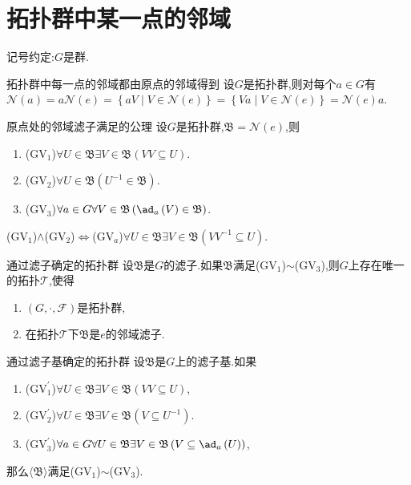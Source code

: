 \section{拓扑群中某一点的邻域}

记号约定:$G$是群.

\begin{proposition}{拓扑群中每一点的邻域都由原点的邻域得到}{}
	设$G$是拓扑群,则对每个$a\in G$有$\mathcal{N}\left(a\right)=a\mathcal{N}\left(e\right)=\left\{aV\middle|V\in\mathcal{N}\left(e\right)\right\}=\left\{Va\middle|V\in\mathcal{N}\left(e\right)\right\}=\mathcal{N}\left(e\right)a$.
\end{proposition}

\begin{proposition}{原点处的邻域滤子满足的公理}{}
	设$G$是拓扑群,$\mathfrak{B}=\mathcal{N}\left(e\right)$,则
	\begin{enumerate}
		\item ($\mathrm{GV}_{1}$)$\forall U\in\mathfrak{B}\exists V\in\mathfrak{B}\left(VV\subseteq U\right)$.
		\item ($\mathrm{GV}_{2}$)$\forall U\in\mathfrak{B}\left(U^{-1}\in\mathfrak{B}\right)$.
		\item ($\mathrm{GV}_{3}$)$\forall a\in G\forall V\in\mathfrak{B}\left(\ad_{a}\left(V\right)\in\mathfrak{B}\right)$.
	\end{enumerate}
\end{proposition}

\begin{remark}{}{}
	($\mathrm{GV}_{1}$)$\wedge$($\mathrm{GV}_{2}$)$\iff$($\mathrm{GV}_{a}$)$\forall U\in\mathfrak{B}\exists V\in\mathfrak{B}\left(VV^{-1}\subseteq U\right)$.
\end{remark}

\begin{proposition}{通过滤子确定的拓扑群}{}
	设$\mathfrak{B}$是$G$的滤子.如果$\mathfrak{B}$满足($\mathrm{GV}_{1}$)$\sim$($\mathrm{GV}_{3}$),则$G$上存在唯一的拓扑$\mathscr{T}$,使得
	\begin{enumerate}
		\item $\left(G,\cdot,\mathscr{F}\right)$是拓扑群,
		\item 在拓扑$\mathscr{T}$下$\mathfrak{B}$是$e$的邻域滤子.
	\end{enumerate}
\end{proposition}

\begin{proposition}{通过滤子基确定的拓扑群}{}
	设$\mathfrak{B}$是$G$上的滤子基.如果
	\begin{enumerate}
		\item ($\mathrm{GV}_{1}^{\prime}$)$\forall U\in\mathfrak{B}\exists V\in\mathfrak{B}\left(VV\subseteq U\right)$,
		\item ($\mathrm{GV}_{2}^{\prime}$)$\forall U\in\mathfrak{B}\exists V\in\mathfrak{B}\left(V\subseteq U^{-1}\right)$.
		\item ($\mathrm{GV}_{3}^{\prime}$)$\forall a\in G\forall U\in\mathfrak{B}\exists V\in\mathfrak{B}\left(V\subseteq\ad_{a}\left(U\right)\right)$,
	\end{enumerate}
	那么$\langle\mathfrak{B}\rangle$满足($\mathrm{GV}_{1}$)$\sim$($\mathrm{GV}_{3}$).
\end{proposition}

